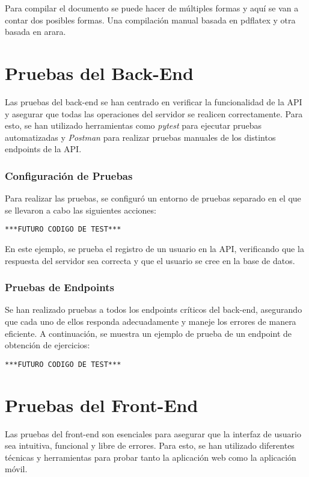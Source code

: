 Para compilar el documento se puede hacer de múltiples formas y aquí se van a contar dos posibles formas. Una compilación manual basada en pdflatex y otra basada en arara.

\section{Pruebas del Back-End}

Las pruebas del back-end se han centrado en verificar la funcionalidad de la API y asegurar que todas las operaciones del servidor se realicen correctamente. Para esto, se han utilizado herramientas como \textit{pytest} para ejecutar pruebas automatizadas y \textit{Postman} para realizar pruebas manuales de los distintos endpoints de la API.

\subsubsection{Configuración de Pruebas}
Para realizar las pruebas, se configuró un entorno de pruebas separado en el que se llevaron a cabo las siguientes acciones:

\begin{verbatim}
***FUTURO CODIGO DE TEST***
\end{verbatim}

En este ejemplo, se prueba el registro de un usuario en la API, verificando que la respuesta del servidor sea correcta y que el usuario se cree en la base de datos.

\subsubsection{Pruebas de Endpoints}
Se han realizado pruebas a todos los endpoints críticos del back-end, asegurando que cada uno de ellos responda adecuadamente y maneje los errores de manera eficiente. A continuación, se muestra un ejemplo de prueba de un endpoint de obtención de ejercicios:

\begin{verbatim}
***FUTURO CODIGO DE TEST***
\end{verbatim}

\section{Pruebas del Front-End}

Las pruebas del front-end son esenciales para asegurar que la interfaz de usuario sea intuitiva, funcional y libre de errores. Para esto, se han utilizado diferentes técnicas y herramientas para probar tanto la aplicación web como la aplicación móvil.

